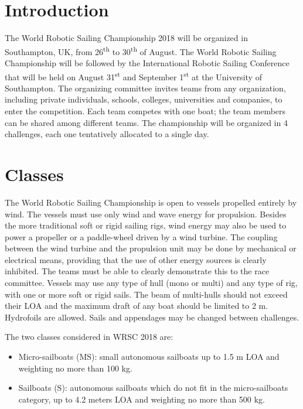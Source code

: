 \documentclass[12pt]{article}
\begin{document}
\maketitle

\section{Introduction}

The World Robotic Sailing Championship 2018 will be organized in Southampton,
UK, from 26\textsuperscript{th} to 30\textsuperscript{th} of August.
The World Robotic Sailing Championship will be followed by
the International Robotic Sailing Conference that will be held on August
31\textsuperscript{st} and September 1\textsuperscript{st} at the University of
Southampton.
The organizing committee invites teams from any organization, including private
individuals, schools, colleges, universities and companies, to enter the competition. 
Each team competes with one boat; the team members can be shared among different teams. 
The championship will be organized in 4 challenges, each one tentatively allocated to a single day.

\section{Classes}

The World Robotic Sailing Championship is open to vessels propelled entirely by
wind. The vessels must use only wind and wave energy for propulsion. 
Besides the more traditional soft or rigid sailing rigs, wind energy may also 
be used to power a propeller or a paddle-wheel driven by a wind turbine. 
The coupling between the wind turbine and the propulsion unit may be done by 
mechanical or electrical means, providing that the use of other energy sources
is clearly inhibited. The teams must be able to clearly demonstrate 
this to the race committee.
Vessels may use any type of hull (mono or multi) and any type of rig, with
one or more soft or rigid sails. The beam of multi-hulls should not exceed their 
LOA and the maximum draft of any boat should be limited to 2 m. 
Hydrofoils are allowed. Sails and appendages may be changed between challenges.

The two classes considered in WRSC 2018 are:
\begin{itemize}
  \item Micro-sailboats (MS): small autonomous sailboats up to 1.5 m LOA and weighting no more than 100 kg.
  \item Sailboats (S): autonomous sailboats which do not fit in the micro-sailboats category, up to
4.2 meters LOA and weighting no more than 500 kg.
\end{itemize}
\end{document}
